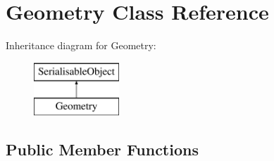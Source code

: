 \hypertarget{classGeometry}{\section{Geometry Class Reference}
\label{classGeometry}
}
Inheritance diagram for Geometry\-:\begin{figure}[H]
\begin{center}
\leavevmode
\includegraphics[height=2.000000cm]{classGeometry}
\end{center}
\end{figure}
\subsection*{Public Member Functions}
